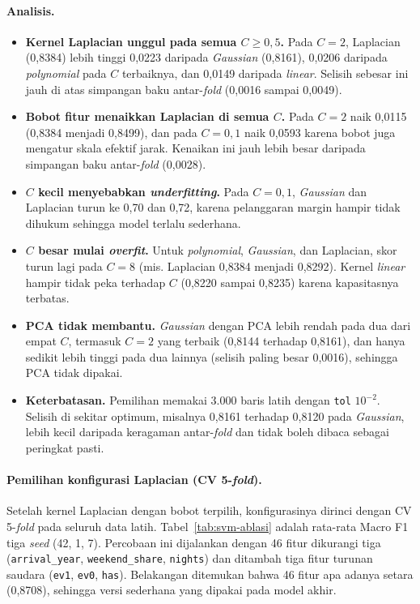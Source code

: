 \paragraph{Analisis.}
\begin{itemize}
	\item \textbf{Kernel Laplacian unggul pada semua $C \ge 0{,}5$.} Pada $C = 2$, Laplacian (0,8384) lebih tinggi 0,0223 daripada \textit{Gaussian} (0,8161), 0,0206 daripada \textit{polynomial} pada $C$ terbaiknya, dan 0,0149 daripada \textit{linear}. Selisih sebesar ini jauh di atas simpangan baku antar-\textit{fold} (0,0016 sampai 0,0049).
	\item \textbf{Bobot fitur menaikkan Laplacian di semua $C$.} Pada $C = 2$ naik 0,0115 (0,8384 menjadi 0,8499), dan pada $C = 0{,}1$ naik 0,0593 karena bobot juga mengatur skala efektif jarak. Kenaikan ini jauh lebih besar daripada simpangan baku antar-\textit{fold} (0,0028).
	\item \textbf{$C$ kecil menyebabkan \textit{underfitting}.} Pada $C = 0{,}1$, \textit{Gaussian} dan Laplacian turun ke 0,70 dan 0,72, karena pelanggaran margin hampir tidak dihukum sehingga model terlalu sederhana.
	\item \textbf{$C$ besar mulai \textit{overfit}.} Untuk \textit{polynomial}, \textit{Gaussian}, dan Laplacian, skor turun lagi pada $C = 8$ (mis. Laplacian 0,8384 menjadi 0,8292). Kernel \textit{linear} hampir tidak peka terhadap $C$ (0,8220 sampai 0,8235) karena kapasitasnya terbatas.
	\item \textbf{PCA tidak membantu.} \textit{Gaussian} dengan PCA lebih rendah pada dua dari empat $C$, termasuk $C = 2$ yang terbaik (0,8144 terhadap 0,8161), dan hanya sedikit lebih tinggi pada dua lainnya (selisih paling besar 0,0016), sehingga PCA tidak dipakai.
	\item \textbf{Keterbatasan.} Pemilihan memakai 3.000 baris latih dengan \texttt{tol} $10^{-2}$. Selisih di sekitar optimum, misalnya 0,8161 terhadap 0,8120 pada \textit{Gaussian}, lebih kecil daripada keragaman antar-\textit{fold} dan tidak boleh dibaca sebagai peringkat pasti.
\end{itemize}

\paragraph{Pemilihan konfigurasi Laplacian (CV 5-\textit{fold}).} Setelah kernel Laplacian dengan bobot terpilih, konfigurasinya dirinci dengan CV 5-\textit{fold} pada seluruh data latih. Tabel~\ref{tab:svm-ablasi} adalah rata-rata Macro F1 tiga \textit{seed} (42, 1, 7). Percobaan ini dijalankan dengan 46 fitur dikurangi tiga (\texttt{arrival\_year}, \texttt{weekend\_share}, \texttt{nights}) dan ditambah tiga fitur turunan saudara (\texttt{ev1}, \texttt{ev0}, \texttt{has}). Belakangan ditemukan bahwa 46 fitur apa adanya setara (0,8708), sehingga versi sederhana yang dipakai pada model akhir.

